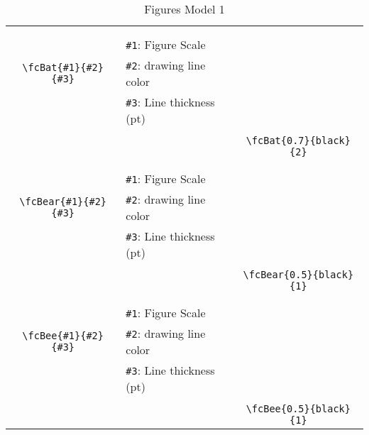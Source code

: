 \documentclass[x11names]{article}
\begin{document}
\begin{table}[H]
\begin{tabular}{|c|l|c|}
	&&\multirow{5}{*}{\fcBat{0.7}{black}{2}}\\	&&\\	&\verb|#1|: Figure Scale &\\	\verb|\fcBat{#1}{#2}{#3}|&	\verb|#2|: drawing line color &\\	&\verb|#3|: Line thickness (pt) &\\ &&\\&&	\verb|\fcBat{0.7}{black}{2}|\\\hline 	
	&&\multirow{5}{*}{\fcBear{0.5}{black}{1}}\\	&&\\	&\verb|#1|: Figure Scale &\\	\verb|\fcBear{#1}{#2}{#3}|&	\verb|#2|: drawing line color &\\	&\verb|#3|: Line thickness (pt) &\\ &&\\&&	\verb|\fcBear{0.5}{black}{1}|\\\hline 	
	&&\multirow{5}{*}{\fcBee{0.5}{black}{1}}\\	&&\\	&\verb|#1|: Figure Scale &\\	\verb|\fcBee{#1}{#2}{#3}|&	\verb|#2|: drawing line color &\\	&\verb|#3|: Line thickness (pt) &\\ &&\\&&	\verb|\fcBee{0.5}{black}{1}|\\\hline 	\hline\end{tabular}\caption{Figures Model 1}\label{tab1}\end{table}
\end{document}
